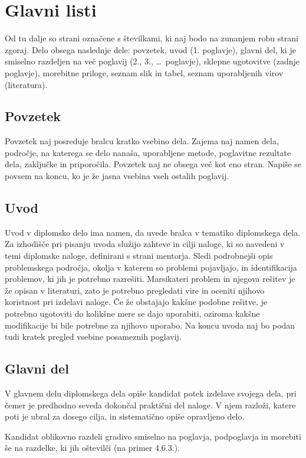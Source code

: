 \documentclass[12pt,a4paper]{book}
\begin{document}
\section{Glavni listi}
Od tu dalje so strani označene s številkami, ki naj bodo na zunanjem robu strani zgoraj. 
Delo obsega naslednje dele: povzetek, uvod (1. poglavje), glavni del, ki je smiselno razdeljen na več poglavij (2., 3., \ldots\ poglavje),
sklepne ugotovitve (zadnje poglavje), morebitne priloge, seznam slik in tabel, seznam uporabljenih virov (literatura). 

\subsection{Povzetek}
Povzetek naj posreduje bralcu kratko vsebino dela. Zajema naj namen dela, področje, na katerega se delo nanaša,
uporabljene metode, poglavitne rezultate dela, zaključke in priporočila.  
Povzetek naj ne obsega več kot eno stran. Napiše se povsem na koncu, ko je že jasna vsebina vseh ostalih poglavij.

\subsection{Uvod}
Uvod v diplomsko delo ima namen, da uvede bralca v tematiko dip\-lom\-ske\-ga dela. Za izhodišče pri pisanju uvoda služijo zahteve
in cilji naloge, ki so navedeni v temi diplomske naloge, definirani s strani mentorja. Sledi podrobnejši opis problemskega področja, okolja v
katerem so problemi pojavljajo, in identifikacija problemov, ki jih je potrebno razrešiti. Marsikateri problem in njegova rešitev je že opisan
v literaturi, zato je potrebno pregledati vire in oceniti njihovo koristnost pri izdelavi naloge. Če že obstajajo kakšne podobne rešitve, je
potrebno ugotoviti do kolikšne mere se dajo uporabiti, oziroma kakšne modifikacije bi bile potrebne za njihovo uporabo.
Na koncu uvoda naj bo podan tudi kratek pregled vsebine posameznih poglavij.

\subsection{Glavni del}
V glavnem delu diplomskega dela opiše kandidat potek izdelave svojega dela, 
pri čemer je predhodno seveda dokončal praktični del naloge.  V njem razloži, katere poti je ubral za dosego cilja, in sistematično opiše
opravljeno delo.

Kandidat oblikovno razdeli gradivo smiselno na poglavja, podpoglavja in morebiti še na razdelke, ki jih oštevilči 
(na primer 4.6.3.). 
\end{document}
